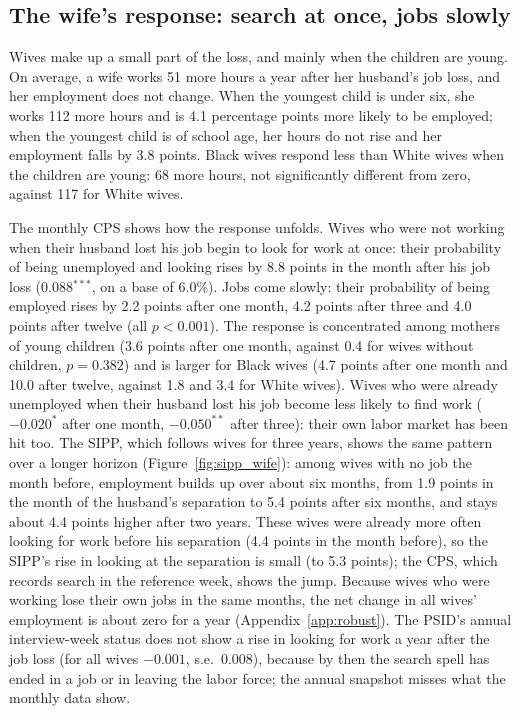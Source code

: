 \subsection{The wife's response: search at once, jobs slowly}

Wives make up a small part of the loss, and mainly when the children are young. On average, a wife works 51 more hours
a year after her husband's job loss, and her employment does not change. When the youngest child is under six, she
works 112 more hours and is 4.1 percentage points more likely to be employed; when the youngest child is of school age,
her hours do not rise and her employment falls by 3.8 points. Black wives respond less than White wives when the
children are young: 68 more hours, not significantly different from zero, against 117 for White wives.

The monthly CPS shows how the response unfolds. Wives who were not working when their husband lost his job begin to
look for work at once: their probability of being unemployed and looking rises by 8.8 points in the month after his job
loss (0.088$^{***}$, on a base of 6.0\%). Jobs come slowly: their probability of being employed rises by 2.2 points after
one month, 4.2 points after three and 4.0 points after twelve (all $p<0.001$). The response is concentrated among
mothers of young children (3.6 points after one month, against 0.4 for wives without children, $p=0.382$) and is larger
for Black wives (4.7 points after one month and 10.0 after twelve, against 1.8 and 3.4 for White wives). Wives who were
already unemployed when their husband lost his job become less likely to find work ($-0.020^{*}$ after one month,
$-0.050^{**}$ after three): their own labor market has been hit too. The SIPP, which follows wives for three years, shows the same
pattern over a longer horizon (Figure~\ref{fig:sipp_wife}): among wives with no job the month before, employment
builds up over about six months, from 1.9 points in the month of the husband's separation to 5.4 points after six
months, and stays about 4.4 points higher after two years. These wives were already more often looking for work before
his separation (4.4 points in the month before), so the SIPP's rise in looking at the separation is small (to 5.3
points); the CPS, which records search in the reference week, shows the jump. Because wives who were working lose their
own jobs in the same months, the net change in all wives' employment is about zero for a year
(Appendix~\ref{app:robust}). The
PSID's annual interview-week status does not show a rise in looking for work a year after the job loss (for all wives $-0.001$, s.e.\ 0.008), because by then the search
spell has ended in a job or in leaving the labor force; the annual snapshot misses what the monthly data show.

